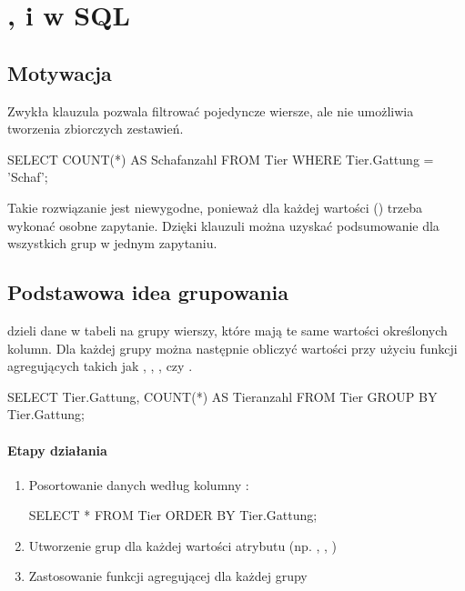 
\section{,  i  w SQL}

\subsection{Motywacja}
    Zwykła klauzula  pozwala filtrować pojedyncze wiersze, ale nie umożliwia tworzenia zbiorczych zestawień. 
 
    \begin{sql}
    SELECT COUNT(*) AS Schafanzahl
        FROM Tier
        WHERE Tier.Gattung = 'Schaf';
    \end{sql}

    Takie rozwiązanie jest niewygodne, ponieważ dla każdej wartości () trzeba wykonać osobne zapytanie.  
    Dzięki klauzuli  można uzyskać podsumowanie dla wszystkich grup w jednym zapytaniu.

\subsection{Podstawowa idea grupowania}
     dzieli dane w tabeli na grupy wierszy, które mają te same wartości określonych kolumn.  
    Dla każdej grupy można następnie obliczyć wartości przy użyciu funkcji agregujących takich jak , , ,  czy .

    \begin{sql}
    SELECT Tier.Gattung, COUNT(*) AS Tieranzahl
        FROM Tier
        GROUP BY Tier.Gattung;
    \end{sql}

\paragraph{Etapy działania}
\begin{enumerate}
    \item Posortowanie danych według kolumny :
    \begin{sql}
    SELECT * FROM Tier ORDER BY Tier.Gattung;
    \end{sql}
    \item Utworzenie grup dla każdej wartości atrybutu (np. , , )
    \item Zastosowanie funkcji agregującej  dla każdej grupy
\end{enumerate}

